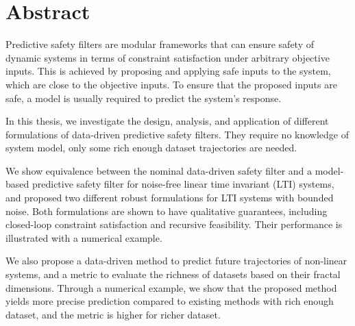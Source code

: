 




 \setcounter{tocdepth}{2}
 \tableofcontents

 \cleardoublepage


\chapter*{Abstract}

Predictive safety filters are modular frameworks that can ensure safety of dynamic systems in terms of constraint satisfaction under arbitrary objective inputs.
This is achieved by proposing and applying safe inputs to the system, which are close to the objective inputs.
To ensure that the proposed inputs are safe, a model is usually required to predict the system's response.

In this thesis, we investigate the design, analysis, and application of different formulations of data-driven predictive safety filters.
They require no knowledge of system model, only some rich enough dataset trajectories are needed.

We show equivalence between the nominal data-driven safety filter and a model-based predictive safety filter for noise-free linear time invariant (LTI) systems, and proposed two different robust formulations for LTI systems with bounded noise.
Both formulations are shown to have qualitative guarantees, including closed-loop constraint satisfaction and recursive feasibility.
Their performance is illustrated with a numerical example.

We also propose a data-driven method to predict future trajectories of non-linear systems, and a metric to evaluate the richness of datasets based on their fractal dimensions.
Through a numerical example, we show that the proposed method yields more precise prediction compared to existing methods with rich enough dataset, and the metric is higher for richer dataset.

